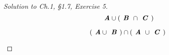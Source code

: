 \documentclass[12pt]{amsart}
\numberwithin{equation}{section}
\theoremstyle{definition}
\theoremstyle{remark}
\begin{document}
\begin{proof}[Solution to Ch.1, \S 1.7,  Exercise 5] \ \\
$$
 \textbf{ \textit{A}} \cup ( \textbf{ \textit{B} }  \cap \textbf{ \textit{C} } )
$$

\begin{center}
\def\firstcircle{(0,0) circle (1.5cm)}
\def\secondcircle{(45:2cm) circle (1.5cm)}
\def\thirdcircle{(0:2cm) circle (1.5cm)}
\end{center}

$$
( \textbf{ \textit{A}} \cup \textbf{ \textit{B} } ) \cap ( \textbf{ \textit{A} } \cup \textbf{ \textit{C} } ) 
$$

\begin{center}

\def\firstcircle{(0,0) circle (1.5cm)}
\def\secondcircle{(45:2cm) circle (1.5cm)}
\def\thirdcircle{(0:2cm) circle (1.5cm)}

\end{center}

\end{proof}


\end{document}
